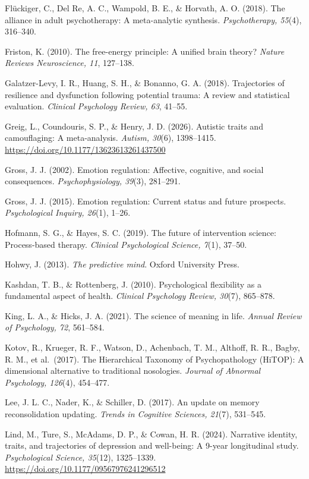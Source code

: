\documentclass[
  11pt,
]{article}
\begin{document}
Flückiger, C., Del Re, A. C., Wampold, B. E., \& Horvath, A. O. (2018).
The alliance in adult psychotherapy: A meta-analytic synthesis.
\emph{Psychotherapy, 55}(4), 316--340.

Friston, K. (2010). The free-energy principle: A unified brain theory?
\emph{Nature Reviews Neuroscience, 11}, 127--138.

Galatzer-Levy, I. R., Huang, S. H., \& Bonanno, G. A. (2018).
Trajectories of resilience and dysfunction following potential trauma: A
review and statistical evaluation. \emph{Clinical Psychology Review,
63}, 41--55.

Greig, L., Coundouris, S. P., \& Henry, J. D. (2026). Autistic traits
and camouflaging: A meta-analysis. \emph{Autism, 30}(6), 1398--1415.
\url{https://doi.org/10.1177/13623613261437500}

Gross, J. J. (2002). Emotion regulation: Affective, cognitive, and
social consequences. \emph{Psychophysiology, 39}(3), 281--291.

Gross, J. J. (2015). Emotion regulation: Current status and future
prospects. \emph{Psychological Inquiry, 26}(1), 1--26.

Hofmann, S. G., \& Hayes, S. C. (2019). The future of intervention
science: Process-based therapy. \emph{Clinical Psychological Science,
7}(1), 37--50.

Hohwy, J. (2013). \emph{The predictive mind}. Oxford University Press.

Kashdan, T. B., \& Rottenberg, J. (2010). Psychological flexibility as a
fundamental aspect of health. \emph{Clinical Psychology Review, 30}(7),
865--878.

King, L. A., \& Hicks, J. A. (2021). The science of meaning in life.
\emph{Annual Review of Psychology, 72}, 561--584.

Kotov, R., Krueger, R. F., Watson, D., Achenbach, T. M., Althoff, R. R.,
Bagby, R. M., et al.~(2017). The Hierarchical Taxonomy of
Psychopathology (HiTOP): A dimensional alternative to traditional
nosologies. \emph{Journal of Abnormal Psychology, 126}(4), 454--477.

Lee, J. L. C., Nader, K., \& Schiller, D. (2017). An update on memory
reconsolidation updating. \emph{Trends in Cognitive Sciences, 21}(7),
531--545.

Lind, M., Ture, S., McAdams, D. P., \& Cowan, H. R. (2024). Narrative
identity, traits, and trajectories of depression and well-being: A
9-year longitudinal study. \emph{Psychological Science, 35}(12),
1325--1339. \url{https://doi.org/10.1177/09567976241296512}
\end{document}
